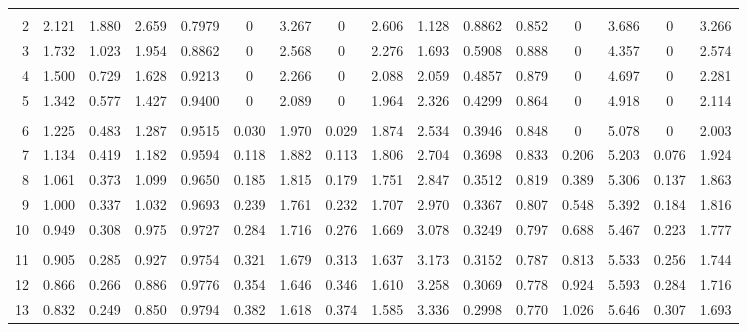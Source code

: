 ﻿\documentclass{article}
\begin{document}
\begin{center}
\begin{tabular}{|r|c|c|c|c|c|c|c|c|c|c|c|c|c|c|c|}
       &       &        &       &       &       &       &       &
       &       &        &       &       &       &       &       \\
     2 & 2.121 & 1.880 & 2.659 & 0.7979 &   0   & 3.267 &   0   & 2.606
       & 1.128 & 0.8862 & 0.852 &   0   & 3.686 &   0   & 3.266 \\
     3 & 1.732 & 1.023 & 1.954 & 0.8862 &   0   & 2.568 &   0   & 2.276
       & 1.693 & 0.5908 & 0.888 &   0   & 4.357 &   0   & 2.574 \\
     4 & 1.500 & 0.729 & 1.628 & 0.9213 &   0   & 2.266 &   0   & 2.088
       & 2.059 & 0.4857 & 0.879 &   0   & 4.697 &   0   & 2.281 \\
     5 & 1.342 & 0.577 & 1.427 & 0.9400 &   0   & 2.089 &   0   & 1.964
       & 2.326 & 0.4299 & 0.864 &   0   & 4.918 &   0   & 2.114 \\
       &       &        &       &       &       &       &       &
       &       &        &       &       &       &       &       \\
     6 & 1.225 & 0.483 & 1.287 & 0.9515 & 0.030 & 1.970 & 0.029 & 1.874
       & 2.534 & 0.3946 & 0.848 &   0   & 5.078 &   0   & 2.003 \\
     7 & 1.134 & 0.419 & 1.182 & 0.9594 & 0.118 & 1.882 & 0.113 & 1.806
       & 2.704 & 0.3698 & 0.833 & 0.206 & 5.203 & 0.076 & 1.924 \\
     8 & 1.061 & 0.373 & 1.099 & 0.9650 & 0.185 & 1.815 & 0.179 & 1.751
       & 2.847 & 0.3512 & 0.819 & 0.389 & 5.306 & 0.137 & 1.863 \\
     9 & 1.000 & 0.337 & 1.032 & 0.9693 & 0.239 & 1.761 & 0.232 & 1.707
       & 2.970 & 0.3367 & 0.807 & 0.548 & 5.392 & 0.184 & 1.816 \\
    10 & 0.949 & 0.308 & 0.975 & 0.9727 & 0.284 & 1.716 & 0.276 & 1.669
       & 3.078 & 0.3249 & 0.797 & 0.688 & 5.467 & 0.223 & 1.777 \\
       &       &        &       &       &       &       &       &
       &       &        &       &       &       &       &       \\
    11 & 0.905 & 0.285 & 0.927 & 0.9754 & 0.321 & 1.679 & 0.313 & 1.637
       & 3.173 & 0.3152 & 0.787 & 0.813 & 5.533 & 0.256 & 1.744 \\
    12 & 0.866 & 0.266 & 0.886 & 0.9776 & 0.354 & 1.646 & 0.346 & 1.610
       & 3.258 & 0.3069 & 0.778 & 0.924 & 5.593 & 0.284 & 1.716 \\
    13 & 0.832 & 0.249 & 0.850 & 0.9794 & 0.382 & 1.618 & 0.374 & 1.585
       & 3.336 & 0.2998 & 0.770 & 1.026 & 5.646 & 0.307 & 1.693 \\

\end{tabular}
\end{center}
\end{document}
